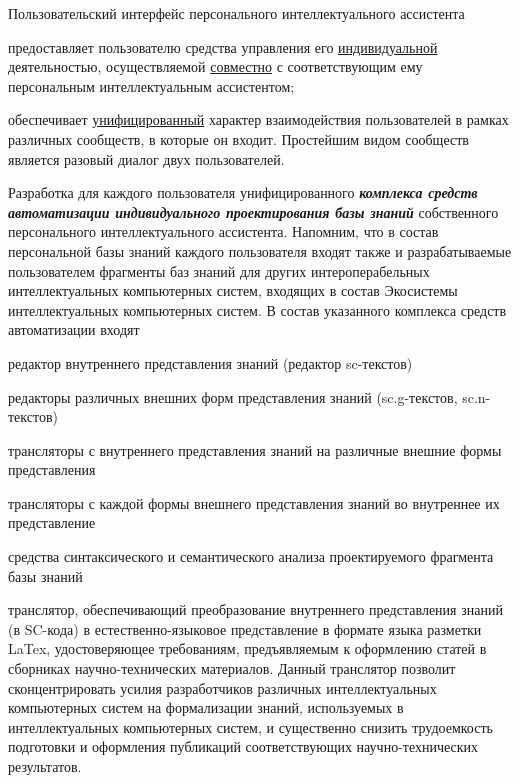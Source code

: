 \begin{textitemize}
	Пользовательский интерфейс персонального интеллектуального ассистента
	\begin{textitemize}
		\item предоставляет пользователю средства управления его \uline{индивидуальной} деятельностью, осуществляемой \uline{совместно} с соответствующим ему персональным интеллектуальным ассистентом;
		\item обеспечивает \uline{унифицированный} характер взаимодействия пользователей в рамках различных сообществ, в которые он входит. Простейшим видом сообществ является разовый диалог двух пользователей.
	\end{textitemize}
	\item
	Разработка для каждого пользователя унифицированного \textbf{\textit{комплекса средств автоматизации индивидуального проектирования базы знаний}} собственного персонального интеллектуального ассистента. Напомним, что в состав персональной базы знаний каждого пользователя входят также и разрабатываемые пользователем фрагменты баз знаний для других интероперабельных интеллектуальных компьютерных систем, входящих в состав Экосистемы интеллектуальных компьютерных систем. В состав указанного комплекса средств автоматизации входят
	\begin{textitemize}
		\item редактор внутреннего представления знаний (редактор sc-текстов)
		\item редакторы различных внешних форм представления знаний (sc.g-текстов, sc.n-текстов)
		\item трансляторы с внутреннего представления знаний на различные внешние формы представления
		\item трансляторы с каждой формы внешнего представления знаний во внутреннее их представление
		\item средства синтаксического и семантического анализа проектируемого фрагмента базы знаний
		\item транслятор, обеспечивающий преобразование внутреннего представления знаний (в SC-кода) в естественно-языковое представление в формате языка разметки LaTex, удостоверяющее требованиям, предъявляемым к оформлению статей в сборниках научно-технических материалов. Данный транслятор позволит сконцентрировать усилия разработчиков различных интеллектуальных компьютерных систем на формализации знаний, используемых в интеллектуальных компьютерных систем, и существенно снизить трудоемкость подготовки и оформления публикаций соответствующих научно-технических результатов.\\

\end{textitemize}
\end{textitemize}
